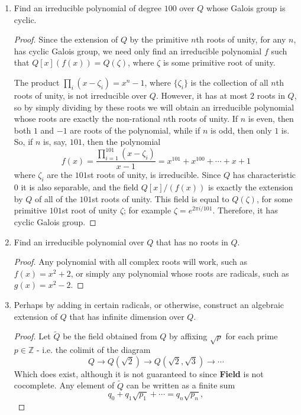 \documentclass[12pt]{article}
\newcommand{\Z}{\mathbb{Z}}
\theoremstyle{definition}
\newenvironment{problem}[2][Problem]{\begin{trivlist}
\item[\hskip \labelsep {\bfseries #1}\hskip \labelsep {\bfseries #2.}]}{\end{trivlist}}
\begin{document}
\begin{problem}{4}
\begin{enumerate}[label=(\alph*)]
\begin{proof}
			\end{proof}
		\item Find an irreducible polynomial of degree $100$ over $Q$ whose Galois group is cyclic.
			\begin{proof}
				Since the extension of $Q$ by the primitive $n$th roots of unity, for any $n$, has cyclic Galois group, we need only find an irreducible polynomial $f$ such that $Q[x](f(x)) = Q(\zeta)$, where $\zeta$ is some primitive root of unity.
				\par The product $\prod_{i} (x - \zeta_i) = x^n - 1$, where $\{\zeta_i\}$  is the collection of all $n$th roots of unity, is not irreducible over $Q$. However, it has at most $2$ roots in $Q$, so by simply dividing by these roots we will obtain an irreducible polynomial whose roots are exactly the non-rational $n$th roots of unity. If $n$ is even, then both $1$ and $-1$ are roots of the polynomial, while if $n$ is odd, then only $1$ is. So, if $n$ is, say, $101$, then the polynomial
				\[f(x) = \frac{\prod_{i = 1}^{101} (x - \zeta_i)}{x - 1} = x^{101} + x^{100} + \cdots + x + 1 \]
				where $\zeta_i$ are the $101$st roots of unity, is irreducible. Since $Q$ has characteristic $0$ it is also separable, and the field $Q[x]/(f(x))$ is exactly the extension by $Q$ of all of the $101$st roots of unity. This field is equal to $Q(\zeta)$, for some primitive $101$st root of unity $\zeta$; for example $\zeta = e^{2\pi i / 101}$. Therefore, it has cyclic Galois group.
			\end{proof}
		\item Find an irreducible polynomial over $Q$ that has no roots in $Q$.
			\begin{proof}
				Any polynomial with all complex roots will work, such as $f(x) = x^2 + 2$, or simply any polynomial whose roots are radicals, such as $g(x) = x^2 - 2$.
			\end{proof}
		\item Perhaps by adding in certain radicals, or otherwise, construct an algebraic extension of $Q$ that has infinite dimension over $Q$.
			\begin{proof}
				Let $\tilde Q$ be the field obtained from $Q$ by affixing $\sqrt p$ for each prime $p \in \Z$ - i.e. the colimit of the diagram
				\[ Q \to Q(\sqrt 2) \to Q(\sqrt 2, \sqrt 3) \to \cdots\]
				Which does exist, although it is not guaranteed to since \textbf{Field} is not cocomplete. Any element of $\tilde Q$ can be written as a finite sum 
				\[q_0 + q_1\sqrt {p_1} + \cdots = q_n \sqrt {p_n},\]

\end{proof}
\end{enumerate}
\end{problem}
\end{document}
